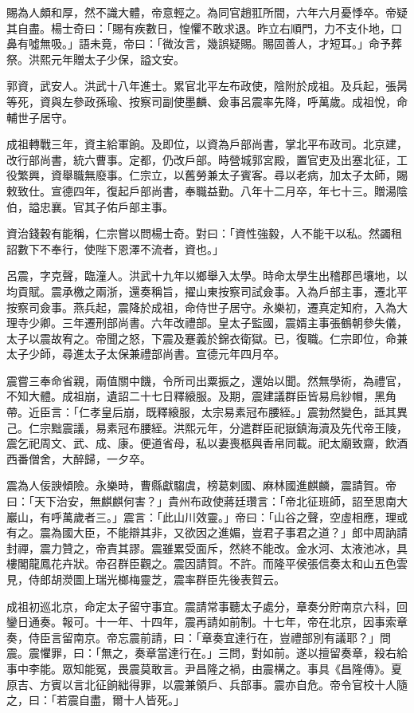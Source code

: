 \begin{pinyinscope}
賜為人頗和厚，然不識大體，帝意輕之。為同官趙羾所間，六年六月憂悸卒。帝疑其自盡。楊士奇曰：「賜有疾數日，惶懼不敢求退。昨立右順門，力不支仆地，口鼻有噓無吸。」語未竟，帝曰：「微汝言，幾誤疑賜。賜固善人，才短耳。」命予葬祭。洪熙元年贈太子少保，謚文安。

郭資，武安人。洪武十八年進士。累官北平左布政使，陰附於成祖。及兵起，張昺等死，資與左參政孫瑜、按察司副使墨麟、僉事呂震率先降，呼萬歲。成祖悅，命輔世子居守。

成祖轉戰三年，資主給軍餉。及即位，以資為戶部尚書，掌北平布政司。北京建，改行部尚書，統六曹事。定都，仍改戶部。時營城郭宮殿，置官吏及出塞北征，工役繁興，資舉職無廢事。仁宗立，以舊勞兼太子賓客。尋以老病，加太子太師，賜敕致仕。宣德四年，復起戶部尚書，奉職益勤。八年十二月卒，年七十三。贈湯陰伯，謚忠襄。官其子佑戶部主事。

資治錢穀有能稱，仁宗嘗以問楊士奇。對曰：「資性強毅，人不能干以私。然蠲租詔數下不奉行，使陛下恩澤不流者，資也。」

呂震，字克聲，臨潼人。洪武十九年以鄉舉入太學。時命太學生出稽郡邑壤地，以均貢賦。震承檄之兩浙，還奏稱旨，擢山東按察司試僉事。入為戶部主事，遷北平按察司僉事。燕兵起，震降於成祖，命侍世子居守。永樂初，遷真定知府，入為大理寺少卿。三年遷刑部尚書。六年改禮部。皇太子監國，震婿主事張鶴朝參失儀，太子以震故宥之。帝聞之怒，下震及蹇義於錦衣衛獄。已，復職。仁宗即位，命兼太子少師，尋進太子太保兼禮部尚書。宣德元年四月卒。

震嘗三奉命省親，兩值關中饑，令所司出粟振之，還始以聞。然無學術，為禮官，不知大體。成祖崩，遺詔二十七日釋縗服。及期，震建議群臣皆易烏紗帽，黑角帶。近臣言：「仁孝皇后崩，既釋縗服，太宗易素冠布腰絰。」震勃然變色，詆其異己。仁宗黜震議，易素冠布腰絰。洪熙元年，分遣群臣祀嶽鎮海瀆及先代帝王陵，震乞祀周文、武、成、康。便道省母，私以妻喪柩與香帛同載。祀太廟致齋，飲酒西番僧舍，大醉歸，一夕卒。

震為人佞諛傾險。永樂時，曹縣獻騶虞，榜葛剌國、麻林國進麒麟，震請賀。帝曰：「天下治安，無麒麒何害？」貴州布政使蔣廷瓚言：「帝北征班師，詔至思南大巖山，有呼萬歲者三。」震言：「此山川效靈。」帝曰：「山谷之聲，空虛相應，理或有之。震為國大臣，不能辯其非，又欲因之進媚，豈君子事君之道？」郎中周訥請封禪，震力贊之，帝責其謬。震雖累受面斥，然終不能改。金水河、太液池冰，具樓閣龍鳳花卉狀。帝召群臣觀之。震因請賀。不許。而隆平侯張信奏太和山五色雲見，侍郎胡濙圖上瑞光榔梅靈芝，震率群臣先後表賀云。

成祖初巡北京，命定太子留守事宜。震請常事聽太子處分，章奏分貯南京六科，回鑾日通奏。報可。十一年、十四年，震再請如前制。十七年，帝在北京，因事索章奏，侍臣言留南京。帝忘震前請，曰：「章奏宜達行在，豈禮部別有議耶？」問震。震懼罪，曰：「無之，奏章當達行在。」三問，對如前。遂以擅留奏章，殺右給事中李能。眾知能冤，畏震莫敢言。尹昌隆之禍，由震構之。事具《昌隆傳》。夏原吉、方賓以言北征餉絀得罪，以震兼領戶、兵部事。震亦自危。帝令官校十人隨之，曰：「若震自盡，爾十人皆死。」


\end{pinyinscope}
